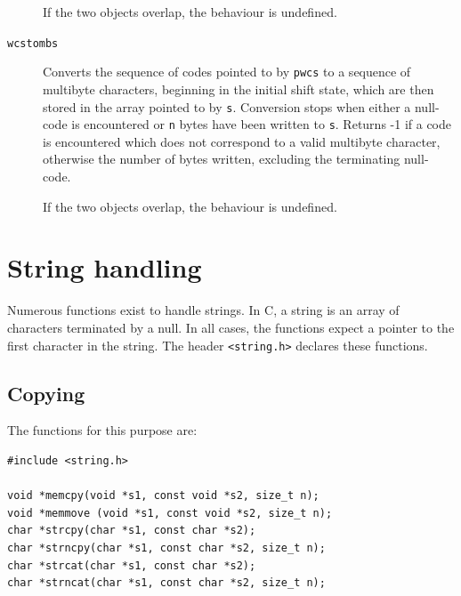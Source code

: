 \begin{description}
     If the two objects overlap, the behaviour is undefined.

    

    \item[\texttt{wcstombs}] 
     Converts the sequence of codes pointed to by  \texttt{pwcs}  to
      a sequence   of  multibyte  characters,  beginning  in  the initial shift
      state, which are then stored in  the  array pointed to by \texttt{s}.
      Conversion stops when either a null-code is encountered  or
      \texttt{n}  bytes  have  been  written  to  \texttt{s}.  Returns
      -1  if  a  code  is  encountered  which does not correspond
      to a valid multibyte character, otherwise  the number  of bytes written,
      excluding the terminating null-code.


     If the two objects overlap, the behaviour is undefined.

    
   \end{description}

  

 
        \section{String handling}
        

  

  Numerous functions exist to handle strings.  In C, a string is an array of
   characters terminated by a null.  In all cases, the functions expect
   a pointer to the first character in the string.  The header
   \texttt{<string.h>} declares these functions.


  \subsection{Copying}
   

   The functions for this purpose are:


   \begin{Verbatim}
#include <string.h>

void *memcpy(void *s1, const void *s2, size_t n);
void *memmove (void *s1, const void *s2, size_t n);
char *strcpy(char *s1, const char *s2);
char *strncpy(char *s1, const char *s2, size_t n);
char *strcat(char *s1, const char *s2);
char *strncat(char *s1, const char *s2, size_t n);
\end{Verbatim}

